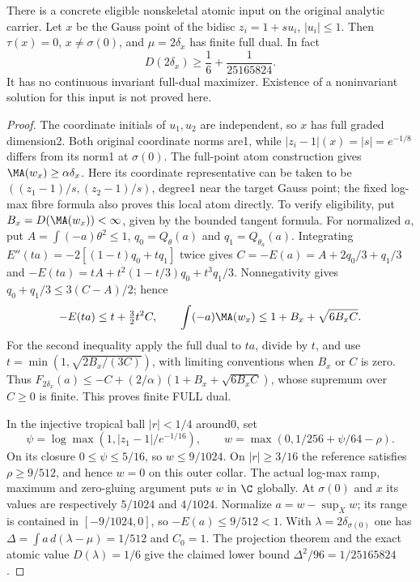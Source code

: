 \begin{corollary}\label{newrad:nonskeletal-example}
There is a concrete eligible nonskeletal atomic input on the original
analytic carrier. Let $x$ be the Gauss point of the bidisc
$z_i=1+s u_i$, $|u_i|\le1$. Then $\tau(x)=0$, $x\ne\sigma(0)$,
and $\mu=2\delta_x$ has finite full dual. In fact
\[
 D(2\delta_x)\ge\frac16+\frac1{25165824}.
\]
It has no continuous invariant full-dual maximizer. Existence of a
noninvariant solution for this input is not proved here.
\end{corollary}
\begin{proof}
The coordinate initials of $u_1,u_2$ are independent, so $x$ has
full graded dimension2. Both original coordinate norms are1, while
$|z_i-1|(x)=|s|=e^{-1/8}$ differs from its norm1 at $\sigma(0)$.
The full-point atom construction gives $\MA(w_x)\ge\alpha\delta_x$.
Here its coordinate representative can be taken to be
$((z_1-1)/s,(z_2-1)/s)$, degree1 near the target Gauss point;
the fixed log-max fibre formula also proves this local atom directly.
To verify eligibility, put $B_x=D(\MA(w_x))<\infty$, given by the
bounded tangent formula. For normalized $a$, put
$A=\int(-a)\theta^2\le1$, $q_0=Q_\theta(a)$ and
$q_1=Q_{\theta_a}(a)$. Integrating
$E''(ta)=-2[(1-t)q_0+tq_1]$ twice gives
$C=-E(a)=A+2q_0/3+q_1/3$ and
$-E(ta)=tA+t^2(1-t/3)q_0+t^3q_1/3$.
Nonnegativity gives $q_0+q_1/3\le3(C-A)/2$; hence
\[
 -E(ta)\le t+\tfrac32t^2C,\qquad
 \int(-a)\MA(w_x)\le1+B_x+\sqrt{6B_x C}.
\]
For the second inequality apply the full dual to $ta$, divide by $t$,
and use $t=\min(1,\sqrt{2B_x/(3C)})$, with limiting conventions
when $B_x$ or $C$ is zero. Thus
$F_{2\delta_x}(a)\le-C+(2/\alpha)(1+B_x+\sqrt{6B_xC})$,
whose supremum over $C\ge0$ is finite. This proves finite FULL dual.

In the injective tropical ball $|r|<1/4$ around0, set
\[
 \psi=\log\max(1,|z_1-1|/e^{-1/16}),\qquad
 w=\max(0,1/256+\psi/64-\rho).
\]
On its closure $0\le\psi\le5/16$, so $w\le9/1024$.
On $|r|\ge3/16$ the reference satisfies $\rho\ge9/512$,
and hence $w=0$ on this outer collar. The actual log-max ramp,
maximum and zero-gluing argument puts $w$ in $\C$ globally.
At $\sigma(0)$ and $x$ its values are respectively $5/1024$ and
$4/1024$. Normalize $a=w-\sup_Xw$; its range is contained in
$[-9/1024,0]$, so $-E(a)\le9/512<1$.
With $\lambda=2\delta_{\sigma(0)}$ one has
$\Delta=\int a\,d(\lambda-\mu)=1/512$ and $C_0=1$.
The projection theorem and the exact atomic value $D(\lambda)=1/6$
give the claimed lower bound $\Delta^2/96=1/25165824$.
\end{proof}

